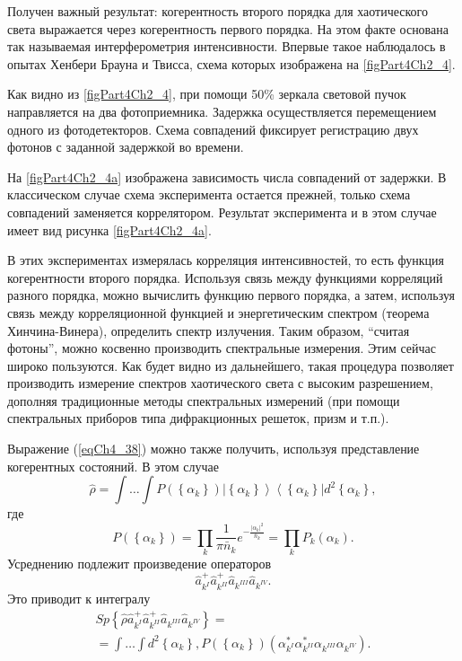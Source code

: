 Получен важный результат: когерентность второго порядка для
хаотического света выражается через когерентность первого порядка. На
этом факте основана так называемая интерферометрия
интенсивности. Впервые такое наблюдалось в опытах Хенбери Брауна и
Твисса, схема которых изображена на \autoref{figPart4Ch2_4}.



Как видно из \autoref{figPart4Ch2_4}, при помощи 50\% зеркала
световой пучок направляется на два фотоприемника. Задержка
осуществляется перемещением одного из фотодетекторов. Схема совпадений
фиксирует регистрацию двух фотонов с заданной задержкой во времени.



На \autoref{figPart4Ch2_4a} изображена зависимость числа совпадений
от задержки. В классическом случае схема эксперимента остается прежней,
только схема совпадений заменяется коррелятором. Результат
эксперимента и в этом случае имеет вид рисунка \ref{figPart4Ch2_4a}. 

В этих экспериментах измерялась корреляция интенсивностей, то есть 
функция когерентности второго порядка. Используя связь между функциями
корреляций разного порядка, можно вычислить функцию первого порядка, а
затем, используя связь между корреляционной функцией и энергетическим
спектром (теорема Хинчина-Винера), определить спектр излучения. Таким
образом, ``считая фотоны'', можно косвенно производить спектральные
измерения. Этим сейчас широко пользуются. Как будет видно из
дальнейшего, такая процедура позволяет производить измерение спектров
хаотического света с высоким разрешением, дополняя традиционные методы
спектральных измерений (при помощи спектральных приборов типа
дифракционных решеток, призм и т.п.). 

Выражение (\ref{eqCh4_38}) можно также получить, используя
представление когерентных состояний. В этом случае
\begin{equation}
\hat{\rho} = \int \dots \int P\left(\left\{\alpha_k\right\}\right)
\left|\left\{\alpha_k\right\}\right>\left<\left\{\alpha_k\right\}\right|d^2 \left\{\alpha_k\right\},
\nonumber
\end{equation}
где
\begin{equation}
P\left(\left\{\alpha_k\right\}\right) = \prod_k\frac{1}{\pi
  \bar{n}_k}e^{-\frac{\left|\alpha_k\right|^2}{\bar{n}_k}}=
\prod_k P_k\left(\alpha_k\right).
\nonumber
\end{equation} 
Усреднению подлежит произведение операторов
\begin{equation}
\hat{a}^{+}_{k^{I}}\hat{a}^{+}_{k^{II}}\hat{a}_{k^{III}}\hat{a}_{k^{IV}}.
\nonumber
\end{equation}
Это приводит к интегралу
\begin{eqnarray}
Sp \left\{
\hat{\rho}
\hat{a}^{+}_{k^{I}}\hat{a}^{+}_{k^{II}}\hat{a}_{k^{III}}\hat{a}_{k^{IV}}
\right\} = 
\nonumber \\
= 
\int \dots \int 
d^2 \left\{\alpha_k\right\},
P\left(\left\{\alpha_k\right\}\right)
\left(
\alpha^{*}_{k^{I}}\alpha^{*}_{k^{II}}\alpha_{k^{III}}\alpha_{k^{IV}}
\right).
\nonumber
\end{eqnarray}

